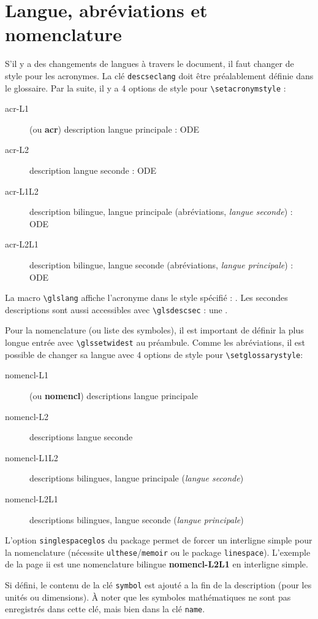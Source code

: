 \documentclass[projet,nohyperref,english,french]{ulthese}
\begin{document}
\section{Langue, abréviations et nomenclature}

S'il y a des changements de langues à travers le document, il faut changer de style pour les acronymes. La clé \texttt{descseclang} doit être préalablement définie dans le glossaire. Par la suite, il y a 4 options de style pour \texttt{\textbackslash setacronymstyle} : 
\begin{description}
	\item[acr-L1] (ou \textbf{acr}) description langue principale :  \acrfull{ODE}
	\item[acr-L2] description langue seconde : \acrfull{ODE}
	\item[acr-L1L2] description bilingue, langue principale (abréviations, \textit{langue seconde}) : \acrfull{ODE}
	\item[acr-L2L1] description bilingue, langue seconde (abréviations, \textit{langue principale}) : \acrfull{ODE}
\end{description}
La macro \texttt{\textbackslash glslang} affiche l'acronyme dans le style spécifié : . Les secondes descriptions sont aussi accessibles avec \texttt{\textbackslash glsdescsec} : une . 

Pour la nomenclature (ou liste des symboles), il est important de définir la plus longue entrée avec \texttt{\textbackslash glssetwidest} au préambule.
Comme les abréviations, il est possible de changer sa langue avec 4 options de style pour \texttt{\textbackslash setglossarystyle}:
\begin{description}
	\item[nomencl-L1] (ou \textbf{nomencl}) descriptions langue principale
	\item[nomencl-L2] descriptions langue seconde
	\item[nomencl-L1L2] descriptions bilingues, langue principale (\textit{langue seconde})
	\item[nomencl-L2L1] descriptions bilingues, langue seconde (\textit{langue principale})
\end{description}
L'option \texttt{singlespaceglos} du package permet de forcer un interligne simple pour la nomenclature (nécessite \texttt{ulthese}/\texttt{memoir} ou le package \texttt{linespace}). L'exemple de la page ii est une nomenclature bilingue \textbf{nomencl-L2L1} en interligne simple.

Si défini, le contenu de la clé \texttt{symbol} est ajouté a la fin de la description (pour les unités ou dimensions). À noter que les symboles mathématiques ne sont pas enregistrés dans cette clé, mais bien dans la clé \texttt{name}.
\end{document}
